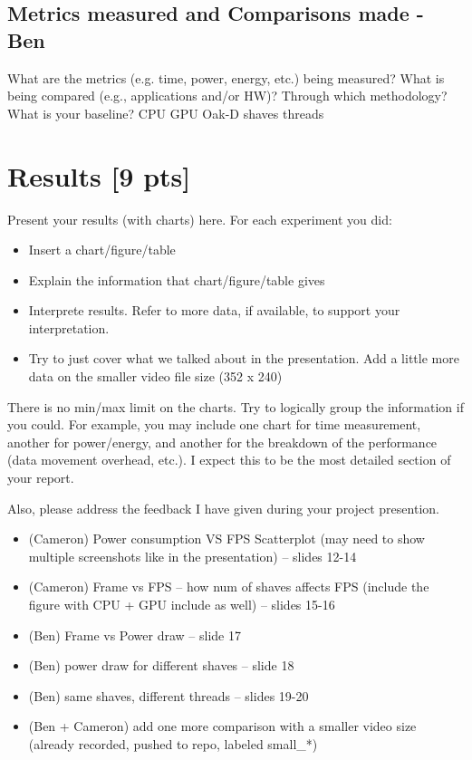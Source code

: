 \documentclass[sigconf,authorversion,nonacm]{acmart}
\begin{document}
\subsection{Metrics measured and Comparisons made - Ben}
What are the metrics (e.g. time, power, energy, etc.) being measured? What is being compared (e.g., applications and/or HW)? Through which methodology? What is your baseline?
CPU GPU Oak-D shaves threads

\section{Results {\small {[9 pts]}}}  
Present your results (with charts) here. For each experiment you did:
\begin{itemize}
    \item Insert a chart/figure/table 
    \item Explain the information that chart/figure/table gives
    \item Interprete results. Refer to more data, if available, to support your interpretation. 
    \item Try to just cover what we talked about in the presentation. Add a little more data on the smaller video file size (352 x 240)
\end{itemize}

There is no min/max limit on the charts. Try to logically group the information if you could. For example, you may include one chart for time measurement, another for power/energy, and another for the breakdown of the performance (data movement overhead, etc.). I expect this to be the most detailed section of your report.

Also, please address the feedback I have given during your project presention.

\begin{itemize}
    \item (Cameron) Power consumption VS FPS Scatterplot (may need to show multiple screenshots like in the presentation) -- slides 12-14 
    \item (Cameron) Frame vs FPS -- how num of shaves affects FPS (include the figure with CPU + GPU include as well) -- slides 15-16
    \item (Ben) Frame vs Power draw -- slide 17
    \item (Ben) power draw for different shaves -- slide 18
    \item (Ben) same shaves, different threads -- slides 19-20
    \item (Ben + Cameron) add one more comparison with a smaller video size (already recorded, pushed to repo, labeled small_*)
\end{itemize}
\end{document}
